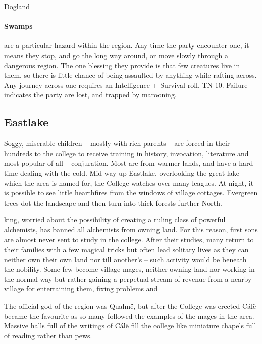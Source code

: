 \begin{multicols}{2}
\begin{encounters}{Dogland}
\end{encounters}

\paragraph{Swamps} are a particular hazard within the region.
Any time the party encounter one, it means they stop, and go the long way around, or move slowly through a dangerous region.
The one blessing they provide is that few creatures live in them, so there is little chance of being assaulted by anything while rafting across.
Any journey across one requires an Intelligence + Survival roll, TN 10.
Failure indicates the party are lost, and trapped by marooning.

\subsection{Eastlake}

Soggy, miserable children -- mostly with rich parents -- are forced in their hundreds to the \gls{college} to receive training in history, invocation, literature and most popular of all -- conjuration.
Most are from warmer lands, and have a hard time dealing with the cold.
Mid-way up Eastlake, overlooking the great lake which the area is named for, the College watches over many leagues.
At night, it is possible to see little hearthfires from the windows of village cottages.
Evergreen trees dot the landscape and then turn into thick forests further North.

\Gls{king}, worried about the possibility of creating a ruling class of powerful alchemists, has banned all alchemists from owning land.
For this reason, first sons are almost never sent to study in the college.
After their studies, many return to their families with a few magical tricks but often lead solitary lives as they can neither own their own land nor till another's -- such activity would be beneath the nobility.
Some few become village mages, neither owning land nor working in the normal way but rather gaining a perpetual stream of revenue from a nearby village for entertaining them, fixing problems and 

The official god of the region was Qualm\"{e}, but after the College was erected C\'{a}l\"{e} became the favourite as so many followed the examples of the mages in the area.
Massive halls full of the writings of C\'{a}l\"{e} fill the college like miniature chapels full of reading rather than pews.


\end{multicols}
